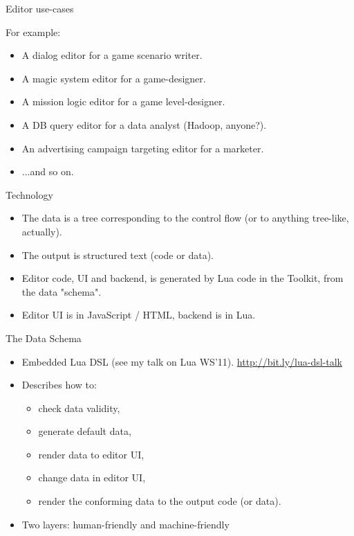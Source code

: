 \documentclass[handout]{beamer}
\begin{document}
\begin{frame}{Editor use-cases}

For example:

\begin{itemize}
\item A dialog editor for a game scenario writer.
\item A magic system editor for a game-designer.
\item A mission logic editor for a game level-designer.
\item A DB query editor for a data analyst (Hadoop, anyone?).
\item An advertising campaign targeting editor for a marketer.
\item ...and so on.
\end{itemize}

\end{frame}


\begin{frame}{Technology}

\begin{itemize}
\item The data is a tree corresponding to the control flow (or to
anything tree-like, actually).
\item The output is structured text (code or data).
\item Editor code, UI and backend, is generated by Lua code in the
Toolkit, from the data "schema".
\item Editor UI is in JavaScript / HTML, backend is in Lua.
\end{itemize}

\end{frame}


\begin{frame}{The Data Schema}

\begin{itemize}
\item Embedded Lua DSL (see my talk on Lua WS'11).
\url{http://bit.ly/lua-dsl-talk}
\item Describes how to:
\begin{itemize}
 \item check data validity,
 \item generate default data,
 \item render data to editor UI,
 \item change data in editor UI,
 \item render the conforming data to the output code (or data).
\end{itemize}
\item Two layers: human-friendly and machine-friendly
\end{itemize}

\end{frame}
\end{document}
